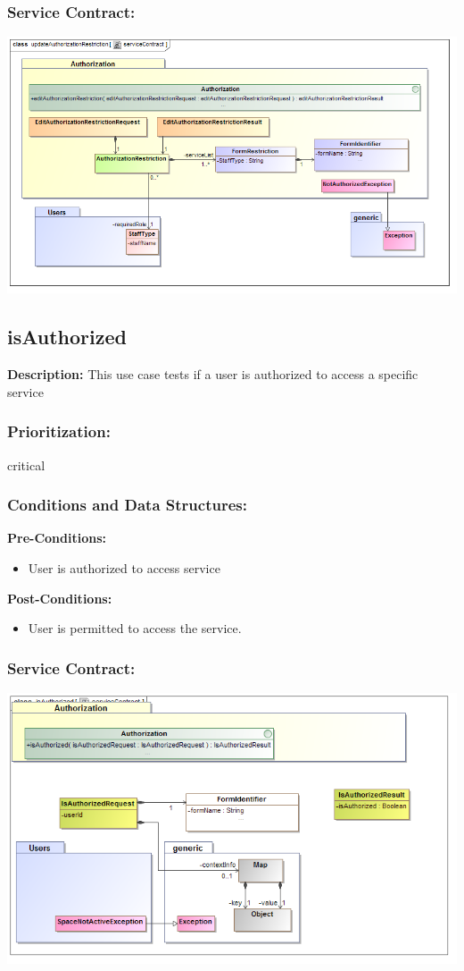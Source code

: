 \subsubsection{Service Contract:}
\includegraphics[width=1\linewidth]{./Graphics/updateAuth}


\subsection{isAuthorized}
\textbf{Description:}
This use case tests if a user is authorized to access a specific service
\subsubsection{Prioritization:}
critical
\subsubsection{Conditions and Data Structures:}
\textbf{Pre-Conditions:}
\begin{itemize}
	\item User is authorized to access service
\end{itemize}
\textbf{Post-Conditions:}
\begin{itemize}
	\item User is permitted to access the service.
\end{itemize}
\subsubsection{Service Contract:}
\includegraphics[width=1\linewidth]{./Graphics/isAuthorized}